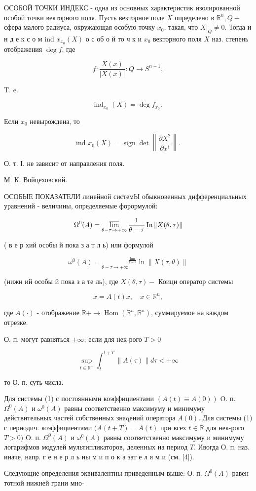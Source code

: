 \documentclass[10pt]{article}
\begin{document}
ОСОБОЙ ТОЧКИ ИНДЕКС - одна из основных характеристик изолированной особой точки векторного поля. Пусть векторное поле $X$ определено в $\mathbb{R}^{n}, Q-$ сфера малого радиуса, окружающая особую точку $x_{0}$, такая, что $\left.X\right|_{Q} \neq 0$. Тогда и н д е к с о м ind $x_{x_{0}}(X)$ о с об о й то ч к и $x_{0}$ векторного поля $X$ наз. степень отображения $\operatorname{deg} f$, где

\[
f: \frac{X(x)}{|X(x)|}: Q \rightarrow S^{n-1},
\]

T. e.

\[
\operatorname{ind}_{x_{0}}(X)=\operatorname{deg} f_{x_{0}} \text {. }
\]

Если $x_{0}$ невырождена, то

\[
\text { ind } x_{0}(X)=\operatorname{sign} \operatorname{det}\left\|\frac{\partial X^{2}}{\partial x^{i}}\right\| \text {. }
\]

О. т. І. не зависит от направления поля.

М. К. Войцеховский.

ОСОБЫЕ ПОКАЗАТЕЛИ линейной системЫ обыкновенных дифференциальных уравнений - величины, определяемые форормулой:

\[
\Omega^{0}(A)=\varlimsup_{\theta-\tau \rightarrow+\infty} \frac{1}{\theta-\tau} \operatorname{In}\|X(\theta, \tau)\|
\]

( в е р хий особы й пока з а т л ь) или формулой

\[
\omega^{0}(A)={\underset{\theta-\tau \rightarrow+\infty}{ }}^{\frac{\lim }{\tau-\theta}} \ln \|X(\tau, \theta)\|
\]

(нижн ий особы й пока з а те ль), где $X(\theta, \tau)-$ Коици оператор системы

\[
\dot{x}=A(t) x, \quad x \in \mathbb{R}^{n},
\]

где $A(\cdot)$ - отображение $\mathbb{R}+\rightarrow \operatorname{Hom}\left(\mathbb{R}^{n}, \mathbb{R}^{n}\right)$, суммируемое на каждом отрезке.

О. п. могут равняться $\pm \infty$; если для нек-рого $T>0$

\[
\sup _{t \in \mathbb{R}^{+}} \int_{t}^{t+T}\|A(\tau)\| d \tau<+\infty
\]

то О. п. суть числа.

Для системы (1) с постоянными коэффициентами $(A(t) \equiv A(0))$ O. п. $\Omega^{0}(A)$ и $\omega^{0}(A)$ равны соответственно максимуму и минимуму действительных частей собствөнных знаqений оператора $A(0)$. Для системы (1) с периодич. коэффициентами $(A(t+T)=A(t)$ при всех $t \in \mathbb{R}$ для нек-рого $T>0)$ O. п. $\Omega^{0}(A)$ и $\omega^{0}(A)$ равны соответственно максимуму и минимуму логарифмов модулей мультипликаторов, деленных на период $T$. Ивогда О. п. наз. иначе, напр. г е н е р л ь ны м и п о к а зат е л я м и (см. [4]).

Следующие определения эквивалентны приведенным выше: О. п. $\Omega^{0}(A)$ равен тотной нижней грани мно-
\end{document}

